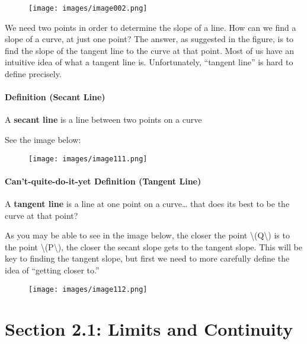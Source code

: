 \begin{figure}
\centering
\texttt{[image: images/image002.png]}
\caption{}
\end{figure}

We need two points in order to determine the slope of a line. How can we
find a slope of a curve, at just one point? The answer, as suggested in
the figure, is to find the slope of the tangent line to the curve at
that point. Most of us have an intuitive idea of what a tangent line is.
Unfortunately, ``tangent line'' is hard to define precisely.

\hypertarget{definition-secant-line}{%
\paragraph{Definition (Secant Line)}\label{definition-secant-line}}

A \textbf{secant line} is a line between two points on a curve

See the image below:

\begin{figure}
\centering
\texttt{[image: images/image111.png]}
\caption{}
\end{figure}

\hypertarget{cant-quite-do-it-yet-definition-tangent-line}{%
\paragraph{Can't-quite-do-it-yet Definition (Tangent
Line)}\label{cant-quite-do-it-yet-definition-tangent-line}}

A \textbf{tangent line} is a line at one point on a curve\ldots{} that
does its best to be the curve at that point?

As you may be able to see in the image below, the closer the point
\textbackslash{}(Q\textbackslash{}) is to the point
\textbackslash{}(P\textbackslash{}), the closer the secant slope gets to
the tangent slope. This will be key to finding the tangent slope, but
first we need to more carefully define the idea of ``getting closer
to.''

\begin{figure}
\centering
\texttt{[image: images/image112.png]}
\caption{}
\end{figure}

\hypertarget{section-2.1-limits-and-continuity}{%
\section{Section 2.1: Limits and
Continuity}\label{section-2.1-limits-and-continuity}}


